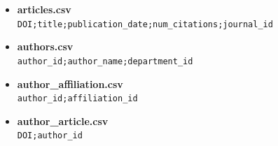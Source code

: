 \documentclass[12pt,a4paper,addpoints,answers]{exam}
\begin{document}
\begin{questions}
\begin{itemize}
    \item \textbf{articles.csv} \vspace{0.5em} \\
    \texttt{DOI;title;publication\_date;num\_citations;journal\_id\\
    }
    
    \item \textbf{authors.csv} \vspace{0.5em} \\
    \texttt{author\_id;author\_name;department\_id\\
    }

    \item \textbf{author\_affiliation.csv} \vspace{0.5em} \\
    \texttt{author\_id;affiliation\_id\\
    }

    \item \textbf{author\_article.csv} \vspace{0.5em} \\
    \texttt{DOI;author\_id\\
    }
    

\end{itemize}
\end{questions}
\end{document}
